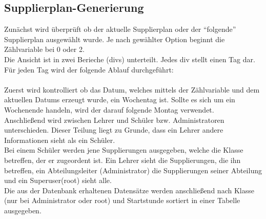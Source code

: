 \subsection{Supplierplan-Generierung}

Zunächst wird überprüft ob der aktuelle Supplierplan oder der \enquote{folgende} Supplierplan ausgewählt wurde. Je nach gewählter Option beginnt die Zählvariable bei 0 oder 2.\\
Die Ansicht ist in zwei Berieche (divs) unterteilt. Jedes div stellt einen Tag dar.\\
Für jeden Tag wird der folgende Ablauf durchgeführt:\\\\
Zuerst wird kontrolliert ob das Datum, welches mittels der Zählvariable und dem aktuellen Datums erzeugt wurde, ein Wochentag ist. Sollte es sich um ein Wochenende handeln, wird der darauf folgende Montag verwendet.\\
Anschließend wird zwischen Lehrer und Schüler bzw. Administratoren unterschieden. Dieser Teilung liegt zu Grunde, dass ein Lehrer andere Informationen sieht als ein Schüler.
\\
Bei einem Schüler werden jene Supplierungen ausgegeben, welche die Klasse betreffen, der er zugeordent ist. Ein Lehrer sieht die Supplierungen, die ihn betreffen, ein Abteilungsleiter (Administrator) die Supplierungen seiner Abteilung und ein Superuser(root) sieht alle.\\
Die aus der Datenbank erhaltenen Datensätze werden anschließend nach Klasse (nur bei Administrator oder root) und Startstunde sortiert in einer Tabelle ausgegeben.

%
%
%
% 
%
